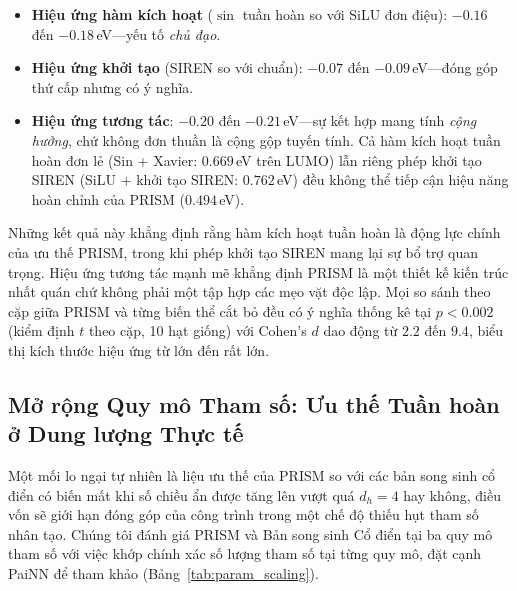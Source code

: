 \documentclass[10pt,twocolumn,letterpaper]{article}
\begin{document}
\begin{itemize}
    \item \textbf{Hiệu ứng hàm kích hoạt} ($\sin$ tuần hoàn so với SiLU đơn điệu): $-0.16$ đến $-0.18$\,eV---yếu tố \textit{chủ đạo}.
    \item \textbf{Hiệu ứng khởi tạo} (SIREN so với chuẩn): $-0.07$ đến $-0.09$\,eV---đóng góp thứ cấp nhưng có ý nghĩa.
    \item \textbf{Hiệu ứng tương tác}: $-0.20$ đến $-0.21$\,eV---sự kết hợp mang tính \textit{cộng hưởng}, chứ không đơn thuần là cộng gộp tuyến tính. Cả hàm kích hoạt tuần hoàn đơn lẻ (Sin + Xavier: $0.669$\,eV trên LUMO) lẫn riêng phép khởi tạo SIREN (SiLU + khởi tạo SIREN: $0.762$\,eV) đều không thể tiếp cận hiệu năng hoàn chỉnh của PRISM ($0.494$\,eV).
\end{itemize}

Những kết quả này khẳng định rằng hàm kích hoạt tuần hoàn là động lực chính của ưu thế PRISM, trong khi phép khởi tạo SIREN mang lại sự bổ trợ quan trọng. Hiệu ứng tương tác mạnh mẽ khẳng định PRISM là một thiết kế kiến trúc nhất quán chứ không phải một tập hợp các mẹo vặt độc lập. Mọi so sánh theo cặp giữa PRISM và từng biến thể cắt bỏ đều có ý nghĩa thống kê tại $p < 0.002$ (kiểm định $t$ theo cặp, 10 hạt giống) với Cohen's $d$ dao động từ $2.2$ đến $9.4$, biểu thị kích thước hiệu ứng từ lớn đến rất lớn.

\subsection{Mở rộng Quy mô Tham số: Ưu thế Tuần hoàn ở Dung lượng Thực tế}
\label{sec:param_scaling}

Một mối lo ngại tự nhiên là liệu ưu thế của PRISM so với các bản song sinh cổ điển có biến mất khi số chiều ẩn được tăng lên vượt quá $d_h = 4$ hay không, điều vốn sẽ giới hạn đóng góp của công trình trong một chế độ thiếu hụt tham số nhân tạo. Chúng tôi đánh giá PRISM và Bản song sinh Cổ điển tại ba quy mô tham số với việc khớp chính xác số lượng tham số tại từng quy mô, đặt cạnh PaiNN để tham khảo (Bảng~\ref{tab:param_scaling}).
\end{document}
